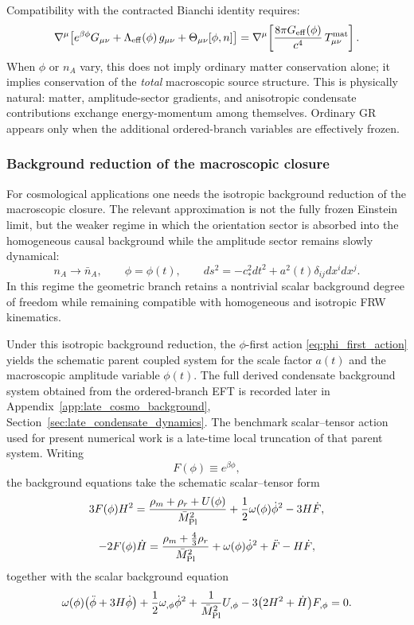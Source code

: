 \documentclass[11pt,a4paper]{article}
\numberwithin{equation}{section}
\begin{document}
Compatibility with the contracted Bianchi identity requires:
\begin{equation}
  \label{eq:bianchi_consistency}
  \nabla^\mu\!\left[
    e^{\beta\phi} G_{\mu\nu}
    + \Lambda_{\rm eff}(\phi)\,g_{\mu\nu}
    + \Theta_{\mu\nu}[\phi,n]
  \right]
  = \nabla^\mu\!\left[
    \frac{8\pi G_{\rm eff}(\phi)}{c^4}\,T^{\rm mat}_{\mu\nu}
  \right].
\end{equation}
When $\phi$ or $n_A$ vary, this does not imply ordinary matter
conservation alone; it implies conservation of the \emph{total}
macroscopic source structure.
This is physically natural: matter, amplitude-sector gradients, and
anisotropic condensate contributions exchange energy-momentum
among themselves.
Ordinary GR appears only when the additional ordered-branch variables
are effectively frozen.

\subsubsection*{Background reduction of the macroscopic closure}
\label{sec:background_reduction_macro}

For cosmological applications one needs the isotropic background
reduction of the macroscopic closure.
The relevant approximation is not the fully frozen Einstein limit,
but the weaker regime in which the orientation sector is absorbed into
the homogeneous causal background while the amplitude sector remains
slowly dynamical:
\[
n_A \to \bar n_A,
\qquad
\phi=\phi(t),
\qquad
ds^2=-c_*^2dt^2+a^2(t)\delta_{ij}dx^idx^j.
\]
In this regime the geometric branch retains a nontrivial scalar
background degree of freedom while remaining compatible with homogeneous
and isotropic FRW kinematics.

Under this isotropic background reduction, the $\phi$-first action
\eqref{eq:phi_first_action} yields the schematic parent coupled system
for the scale factor $a(t)$ and the macroscopic amplitude variable
$\phi(t)$.
The full derived condensate background system obtained from the
ordered-branch EFT is recorded later in
Appendix~\ref{app:late_cosmo_background},
Section~\ref{sec:late_condensate_dynamics}.
The benchmark scalar--tensor action used for present numerical work is a
late-time local truncation of that parent system.
Writing
\[
F(\phi)\equiv e^{\beta\phi},
\]
the background equations take the schematic scalar--tensor form
\begin{equation}
  \label{eq:bg_reduction_friedmann}
  3F(\phi)H^2
  =
  \frac{\rho_m+\rho_r+U(\phi)}{\bar M_{\rm Pl}^2}
  + \frac12 \omega(\phi)\dot\phi^2
  - 3H\dot F,
\end{equation}
\begin{equation}
  \label{eq:bg_reduction_raychaudhuri}
  -2F(\phi)\dot H
  =
  \frac{\rho_m+\tfrac43\rho_r}{\bar M_{\rm Pl}^2}
  + \omega(\phi)\dot\phi^2
  + \ddot F - H\dot F,
\end{equation}
together with the scalar background equation
\begin{equation}
  \label{eq:bg_reduction_scalar}
  \omega(\phi)\bigl(\ddot\phi+3H\dot\phi\bigr)
  + \frac12 \omega_{,\phi}\dot\phi^2
  + \frac{1}{\bar M_{\rm Pl}^2}U_{,\phi}
  - 3\bigl(2H^2+\dot H\bigr)F_{,\phi}
  = 0.
\end{equation}
\end{document}
